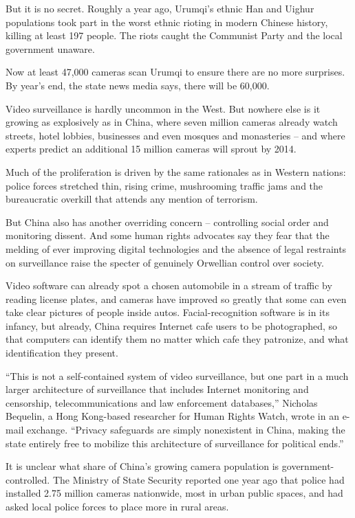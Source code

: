 ﻿\documentclass[12pt]{article}
\begin{document}
But it is no secret. Roughly a year ago, Urumqi's ethnic Han and Uighur populations took part in the
worst ethnic rioting in modern Chinese history, killing at least 197 people. The riots caught the
Communist Party and the local government unaware.

Now at least 47,000 cameras scan Urumqi to ensure there are no more surprises. By year's end, the
state news media says, there will be 60,000.

Video surveillance is hardly uncommon in the West. But nowhere else is it growing as explosively as
in China, where seven million cameras already watch streets, hotel lobbies, businesses and even
mosques and monasteries -- and where experts predict an additional 15 million cameras will sprout by
2014.

Much of the proliferation is driven by the same rationales as in Western nations: police forces
stretched thin, rising crime, mushrooming traffic jams and the bureaucratic overkill that attends
any mention of terrorism.

But China also has another overriding concern -- controlling social order and monitoring dissent.
And some human rights advocates say they fear that the melding of ever improving digital
technologies and the absence of legal restraints on surveillance raise the specter of genuinely
Orwellian control over society.

Video software can already spot a chosen automobile in a stream of traffic by reading license
plates, and cameras have improved so greatly that some can even take clear pictures of people inside
autos. Facial-recognition software is in its infancy, but already, China requires Internet cafe
users to be photographed, so that computers can identify them no matter which cafe they patronize,
and what identification they present.

``This is not a self-contained system of video surveillance, but one part in a much larger
architecture of surveillance that includes Internet monitoring and censorship, telecommunications
and law enforcement databases,'' Nicholas Bequelin, a Hong Kong-based researcher for Human Rights
Watch, wrote in an e-mail exchange. ``Privacy safeguards are simply nonexistent in China, making the
state entirely free to mobilize this architecture of surveillance for political ends.''

It is unclear what share of China's growing camera population is government-controlled. The Ministry
of State Security reported one year ago that police had installed 2.75 million cameras nationwide,
most in urban public spaces, and had asked local police forces to place more in rural areas.
\end{document}
